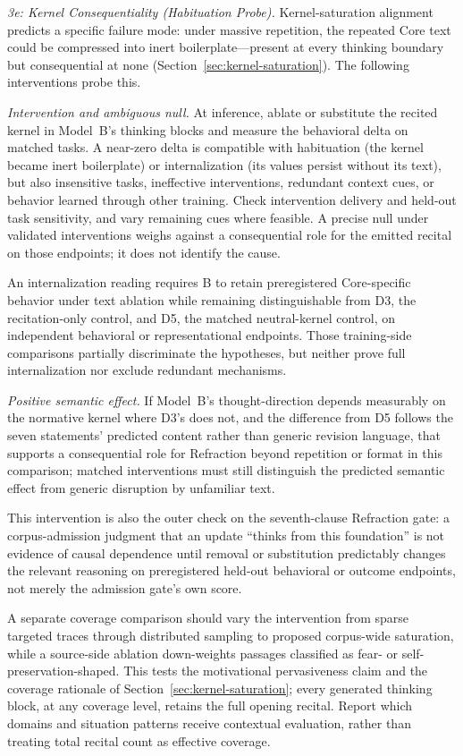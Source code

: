 \documentclass[11pt]{article}
\begin{document}
\emph{3e: Kernel Consequentiality (Habituation Probe).} Kernel-saturation alignment predicts a specific failure mode: under massive repetition, the repeated Core text could be compressed into inert boilerplate---present at every thinking boundary but consequential at none (Section~\ref{sec:kernel-saturation}). The following interventions probe this.

\emph{Intervention and ambiguous null.} At inference, ablate or substitute the
recited kernel in Model~B's thinking blocks and measure the behavioral delta on
matched tasks. A near-zero delta is compatible with habituation (the kernel
became inert boilerplate) or internalization (its values persist without its
text), but also insensitive tasks, ineffective interventions, redundant context
cues, or behavior learned through other training. Check intervention delivery
and held-out task sensitivity, and vary remaining cues where feasible. A
precise null under validated interventions weighs against a consequential role
for the emitted recital on those endpoints; it does not identify the cause.

An internalization reading requires B to retain preregistered Core-specific
behavior under text ablation while remaining distinguishable from D3, the
recitation-only control, and D5, the matched neutral-kernel control, on
independent behavioral or representational endpoints. Those
training-side comparisons partially discriminate the hypotheses, but neither
prove full internalization nor exclude redundant mechanisms.

\emph{Positive semantic effect.} If Model~B's thought-direction depends measurably on the normative kernel where D3's does not, and the difference from D5 follows the seven statements' predicted content rather than generic revision language, that supports a consequential role for Refraction beyond repetition or format in this comparison; matched interventions must still distinguish the predicted semantic effect from generic disruption by unfamiliar text.

This intervention is also the outer check on the seventh-clause Refraction gate:
a corpus-admission judgment that an update ``thinks from this foundation'' is
not evidence of causal dependence until removal or substitution predictably
changes the relevant reasoning on preregistered held-out behavioral or outcome
endpoints, not merely the admission gate's own score.

A separate coverage comparison should vary the intervention from sparse targeted
traces through distributed sampling to proposed corpus-wide saturation, while a
source-side ablation down-weights passages classified as fear- or
self-preservation-shaped. This tests the motivational pervasiveness claim
and the coverage rationale of Section~\ref{sec:kernel-saturation}; every
generated thinking block, at any coverage level, retains the full opening
recital. Report which domains and situation patterns receive contextual
evaluation, rather than treating total recital count as effective coverage.
\end{document}
